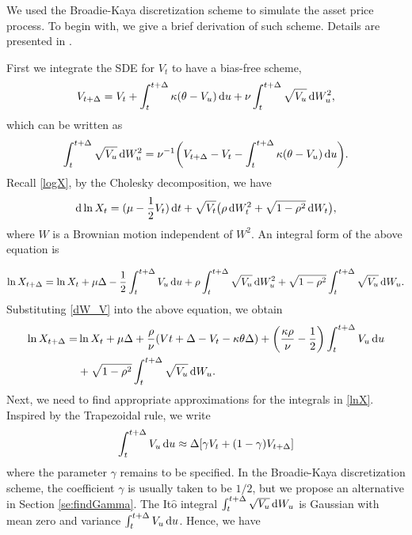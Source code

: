 \documentclass{ws-ijfe}
\begin{document}
We used the Broadie-Kaya discretization scheme to simulate the asset price process. To begin with, we give a brief derivation of such scheme. Details are presented in \cite{Andersen2006}.

First we integrate the SDE for $V_t$ to have a bias-free scheme,
\begin{equation*}
  V_{t+\Delta} = V_t+\int_{t}^{t+\Delta}\kappa(\theta-V_u)\,\mathrm{d} u +\nu\int_{t}^{t+\Delta}\sqrt{V_u}\,\mathrm{d} W_u^2,
\end{equation*}
which can be written as
\begin{equation}\label{dW_V}
\int_{t}^{t+\Delta}\sqrt{V_u}\,\d W_u^2=\nu^{-1}\bigg(V_{t+\Delta}- V_t-\int_{t}^{t+\Delta}\kappa(\theta-V_u)\,\d u\bigg).
\end{equation}
Recall \eqref{logX}, by the Cholesky decomposition, we have
\begin{equation*}
 \mathrm{d} \ln X_t=(\mu-\frac{1}{2}V_t)\,\mathrm{d} t +\sqrt{V_t}\big(\rho\,\mathrm{d} W_t^2+\sqrt{1-\rho^2}\,\mathrm{d} W_t\big),
\end{equation*}
where $W$ is a Brownian motion independent of $W^2$. An integral form of the above equation is

\begin{equation*}
\begin{split}
  \ln X_{t+\Delta}=\ln X_t +\mu\Delta-\frac{1}{2}\int_{t}^{t+\Delta}V_u\,\mathrm{d} u +\rho\int_{t}^{t+\Delta}\sqrt{V_u}\,\mathrm{d} W_u^2+\sqrt{1-\rho^2}\int_{t}^{t+\Delta}\sqrt{V_u}\,\mathrm{d} W_u.
\end{split}
\end{equation*}
Substituting \eqref{dW_V} into the above equation, we obtain
\begin{equation}\label{lnX}
\begin{split}
   \ln X_{t+\Delta}=&\ln X_t+\mu\Delta+\frac{\rho}{\nu}(V{t+\Delta}-V_t-\kappa\theta\Delta)+\bigg(\frac{\kappa\rho}{\nu}-\frac{1}{2}\bigg)\int_{t}^{t+\Delta}V_u\,\d u\\&
   +\sqrt{1-\rho^2}\int_{t}^{t+\Delta}\sqrt{V_u}\,\d W_u.
\end{split}
\end{equation}
Next, we need to find appropriate approximations for the integrals in \eqref{lnX}. Inspired by the Trapezoidal rule, we write
\begin{equation}\label{approx_du}
  \int_{t}^{t+\Delta}V_u\,\d u \approx \Delta[\gamma V_t+(1-\gamma) V_{t+\Delta}]
\end{equation}
where the parameter $\gamma$ remains to be specified. In the Broadie-Kaya discretization scheme, the coefficient $\gamma$ is usually taken to be $1/2$, but we propose an alternative in Section \ref{se:findGamma}.
The It$\hat{\text{o}}$ integral
$
  \int_{t}^{t+\Delta}\sqrt{V_u}\,\mathrm{d} W_u
$
is Gaussian with mean zero and variance $\int_{t}^{t+\Delta}V_u\,\mathrm{d} u$. Hence, we have
\end{document}
